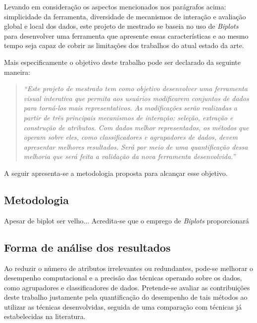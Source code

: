Levando em consideração os aspectos mencionados nos
parágrafos acima: simplicidade da ferramenta, diversidade de
mecanismos de interação e avaliação global e local dos
dados, este projeto de mestrado se baseia no uso de
\emph{Biplots} para desenvolver uma ferramenta que apresente
essas características e ao mesmo tempo seja capaz de cobrir
as limitações dos trabalhos do atual estado da arte.

Mais especificamente o objetivo deste trabalho pode ser
declarado da seguinte maneira:

\begin{quote} \emph{``Este projeto de mestrado tem como
        objetivo desenvolver uma ferramenta visual
        interativa que permita aos usuários modificarem
        conjuntos de dados para torná-los mais
        representativos. As modificações serão realizadas a
        partir de três principais mecanismos de interação:
        seleção, extração e construção de atributos.
        Com dados melhor representados, os métodos que
        operam sobre eles, como classificadores e
        agrupadores de dados, devem apresentar melhores
    resultados. Será por meio de uma quantificação dessa
melhoria que será feita a validação da nova ferramenta
desenvolvida.''} \end{quote}

A seguir apresenta-se a metodologia proposta para alcançar
esse objetivo.

\subsection{Metodologia}

Apesar de biplot ser velho...
Acredita-se que o emprego de \emph{Biplots} proporcionará

\subsection{Forma de análise dos resultados}

Ao reduzir o número de atributos irrelevantes ou redundantes, pode-se melhorar o desempenho computacional e a precisão das técnicas operando sobre os dados, como agrupadores e classificadores de dados. Pretende-se avaliar as contribuições deste trabalho justamente pela quantificação do desempenho de tais métodos ao utilizar as técnicas desenvolvidas, seguida de uma comparação com técnicas já estabelecidas na literatura.







